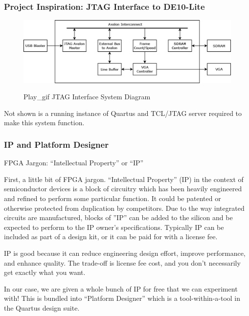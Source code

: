 \documentclass{beamer}
\begin{document}
\begin{frame}
\frametitle{Project Inspiration:  JTAG Interface to DE10-Lite}

\begin{figure}[h]
	\centering
	\includegraphics[width=1.0\textwidth]{graphics/play_gif.png}
	\centering\bfseries
	\caption{Play\_gif JTAG Interface System Diagram}
\end{figure}

Not shown is a running instance of Quartus and TCL/JTAG server required to make this system function.

\end{frame}

\begin{frame}
\frametitle{IP and Platform Designer}

FPGA Jargon:  ``Intellectual Property'' or ``IP''

First, a little bit of FPGA jargon.  ``Intellectual Property'' (IP) in the context of semiconductor devices is a block of circuitry which has been heavily engineered and refined to perform some particular function.  It could be patented or otherwise protected from duplication by competitors.
Due to the way integrated circuits are manufactured, blocks of ''IP'' can be added to the silicon and be expected to perform to the IP owner's specifications.  Typically IP can be included as part of a design kit, or it can be paid for with a license fee.

IP is good because it can reduce engineering design effort, improve performance, and enhance quality.  The trade-off is license fee cost, and you don't necessarily get exactly what you want.

In our case, we are given a whole bunch of IP for free that we can experiment with!  This is bundled into ``Platform Designer'' which is a tool-within-a-tool in the Quartus design suite.

\end{frame}
\end{document}
